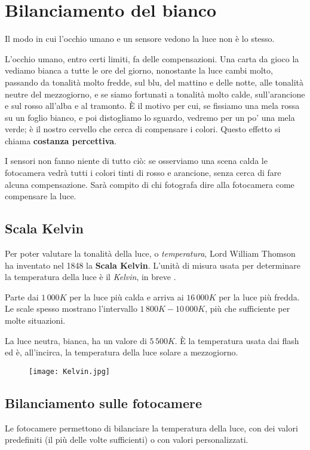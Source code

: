 \section{Bilanciamento del bianco} \label{sec:whitebalance}
Il modo in cui l'occhio umano e un sensore vedono la luce non è lo stesso.

L'occhio umano, entro certi limiti, fa delle compensazioni. Una carta da gioco la vediamo bianca a tutte le ore del giorno, nonostante la luce cambi molto, passando da tonalità molto fredde, sul blu, del mattino e delle notte, alle tonalità neutre del mezzogiorno, e se siamo fortunati a tonalità molto calde, sull'arancione e sul rosso all'alba e al tramonto.
È il motivo per cui, se fissiamo una mela rossa su un foglio bianco, e poi distogliamo lo sguardo, vedremo per un po' una mela verde; è il nostro cervello che cerca di compensare i colori.
Questo effetto si chiama \textbf{costanza percettiva}.

I sensori non fanno niente di tutto ciò: se osserviamo una scena calda le fotocamera vedrà tutti i colori tinti di rosso e arancione, senza cerca di fare alcuna compensazione.
Sarà compito di chi fotografa dire alla fotocamera come compensare la luce.

\subsection{Scala Kelvin} \label{subsec:scalakelvin}
Per poter valutare la tonalità della luce, o \textit{temperatura}, Lord William Thomson ha inventato nel 1848 la \textbf{Scala Kelvin}.
L'unità di misura usata per determinare la temperatura della luce è il \textit{Kelvin}, in breve .

Parte dai $1\,000K$ per la luce più calda e arriva ai $16\,000K$ per la luce più fredda. Le scale spesso mostrano l'intervallo $1\,800K - 10\,000K$, più che sufficiente per molte situazioni.

La luce neutra, bianca, ha un valore di $5\,500K$. È la temperatura usata dai flash ed è, all'incirca, la temperatura della luce solare a mezzogiorno.

\begin{figure}[h]
    \centering
    \texttt{[image: Kelvin.jpg]}
\end{figure}


\subsection{Bilanciamento sulle fotocamere} \label{subsec:bilaciamentofotocamere}
Le fotocamere permettono di bilanciare la temperatura della luce, con dei valori predefiniti (il più delle volte sufficienti) o con valori personalizzati.

